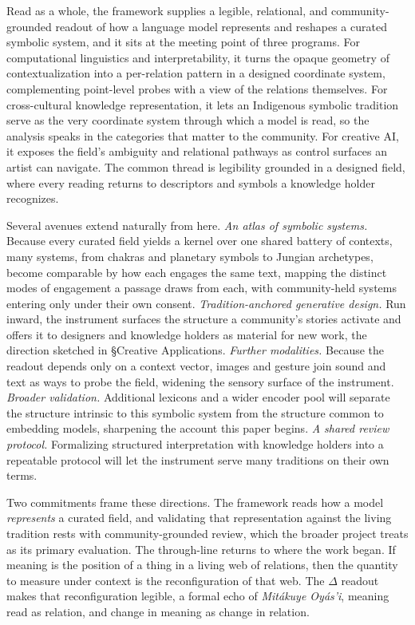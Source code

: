 \documentclass[final,creativeai]{article}
\begin{document}
Read as a whole, the framework supplies a legible, relational, and community-grounded readout of how a language model represents and reshapes a curated symbolic system, and it sits at the meeting point of three programs. For computational linguistics and interpretability, it turns the opaque geometry of contextualization into a per-relation pattern in a designed coordinate system, complementing point-level probes with a view of the relations themselves. For cross-cultural knowledge representation, it lets an Indigenous symbolic tradition serve as the very coordinate system through which a model is read, so the analysis speaks in the categories that matter to the community. For creative AI, it exposes the field's ambiguity and relational pathways as control surfaces an artist can navigate. The common thread is legibility grounded in a designed field, where every reading returns to descriptors and symbols a knowledge holder recognizes.

Several avenues extend naturally from here. \emph{An atlas of symbolic systems.} Because every curated field yields a kernel over one shared battery of contexts, many systems, from chakras and planetary symbols to Jungian archetypes, become comparable by how each engages the same text, mapping the distinct modes of engagement a passage draws from each, with community-held systems entering only under their own consent. \emph{Tradition-anchored generative design.} Run inward, the instrument surfaces the structure a community's stories activate and offers it to designers and knowledge holders as material for new work, the direction sketched in \S Creative Applications. \emph{Further modalities.} Because the readout depends only on a context vector, images and gesture join sound and text as ways to probe the field, widening the sensory surface of the instrument. \emph{Broader validation.} Additional lexicons and a wider encoder pool will separate the structure intrinsic to this symbolic system from the structure common to embedding models, sharpening the account this paper begins. \emph{A shared review protocol.} Formalizing structured interpretation with knowledge holders into a repeatable protocol will let the instrument serve many traditions on their own terms.

Two commitments frame these directions. The framework reads how a model \emph{represents} a curated field, and validating that representation against the living tradition rests with community-grounded review, which the broader project treats as its primary evaluation. The through-line returns to where the work began. If meaning is the position of a thing in a living web of relations, then the quantity to measure under context is the reconfiguration of that web. The $\Delta$ readout makes that reconfiguration legible, a formal echo of \emph{Mitákuye Oyás'i}, meaning read as relation, and change in meaning as change in relation.
\end{document}
